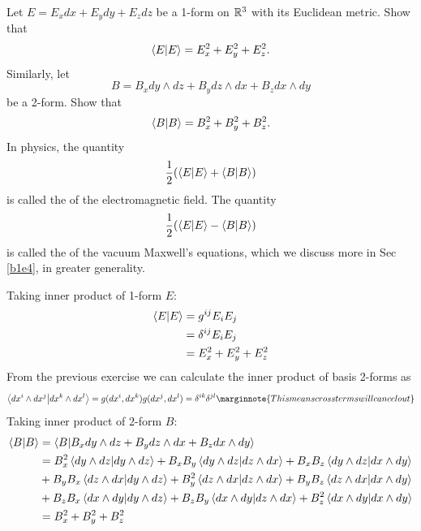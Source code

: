 \documentclass[10pt]{article}
\begin{document}
\begin{example}\label{b1e58}
	Let $E = E_xdx + E_ydy + E_zdz$ be a 1-form on $\mathbb{R}^3$ with its Euclidean metric. Show that
	$$
		\ip{E} = E_x^2 + E_y^2 + E_z^2.
	$$
	Similarly, let
	$$
		B = B_xdy\wedge dz + B_ydz\wedge dx + B_zdx\wedge dy
	$$
	be a 2-form. Show that
	$$
		\ip{B} = B_x^2 + B_y^2 + B_z^2.
	$$
	In physics, the quantity
	$$
		\frac12\p{\ip{E}+\ip{B}}
	$$
	is called the  of the electromagnetic field. The quantity
	$$
		\frac12\p{\ip{E}-\ip{B}}
	$$
	is called the  of the vacuum Maxwell's equations, which we discuss more in Sec \ref{b1e4}, in greater generality.
\end{example}
\sol Taking inner product of 1-form $E$:
$$
\begin{aligned}
	\ip{E} &= g^{ij} E_i E_j\\
	&= \delta^{ij} E_i E_j\\
	&= E_x^2 + E_y^2 + E_z^2
\end{aligned}
$$
From the previous exercise we can calculate the inner product of basis 2-forms as
$$
\ip{dx^i \wedge dx^j}{dx^k \wedge dx^l} = g(dx^i, dx^k)g(dx^j, dx^l) = \delta^{ik}\delta^{jl}\marginnote{This means cross terms will cancel out}
$$
Taking inner product of 2-form $B$:
$$
\begin{aligned}
	\ip{B} &= \ip{B}{B_xdy\wedge dz + B_ydz\wedge dx + B_zdx\wedge dy}\\
	&= B_x^2\ip{dy\wedge dz} + B_xB_y\ip{dy\wedge dz}{dz\wedge dx} + B_xB_z\ip{dy\wedge dz}{dx\wedge dy}\\
	&+ B_yB_x\ip{dz\wedge dx}{dy\wedge dz} + B_y^2\ip{dz\wedge dx} + B_yB_z\ip{dz\wedge dx}{dx\wedge dy}\\
	&+ B_zB_x\ip{dx\wedge dy}{dy\wedge dz} + B_zB_y\ip{dx\wedge dy}{dz\wedge dx} + B_z^2\ip{dx\wedge dy}\\
	&= B_x^2 + B_y^2 + B_z^2
\end{aligned}
$$
\end{document}
